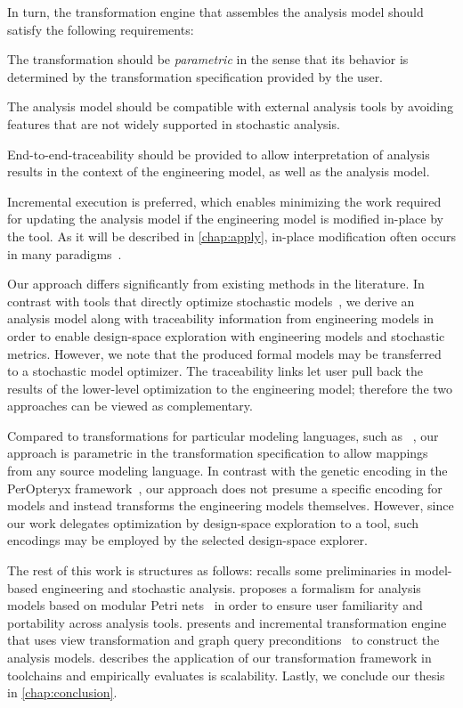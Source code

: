 In turn, the transformation engine that assembles the analysis model should satisfy the following requirements:
\begin{enumerate*}
\item The transformation should be \emph{parametric} in the sense that its behavior is determined by the transformation specification provided by the user.
\item The analysis model should be compatible with external analysis tools by avoiding features that are not widely supported in stochastic analysis.
\item End-to-end-traceability should be provided to allow interpretation of analysis results in the context of the engineering model, as well as the analysis model.
\item Incremental execution is preferred, which enables minimizing the work required for updating the analysis model if the engineering model is modified in-place by the  tool. As it will be described in \cref{chap:apply}, in-place modification often occurs in many  paradigms~\citep{Vanherpen14patterns}.
\end{enumerate*}

Our approach differs significantly from existing methods in the literature. In contrast with tools that directly optimize stochastic models~, we derive an analysis model along with traceability information from engineering models in order to enable design-space exploration with engineering models and stochastic metrics. However, we note that the produced formal models may be transferred to a stochastic model optimizer. The traceability links let user pull back the results of the lower-level optimization to the engineering model; therefore the two approaches can be viewed as complementary.

Compared to transformations for particular modeling languages, such as ~, our approach is parametric in the transformation specification to allow mappings from any source modeling language. In contrast with the genetic encoding in the PerOpteryx framework~\citep{Koziolek11generic}, our approach does not presume a specific encoding for models and instead transforms the engineering models themselves. However, since our work delegates optimization by design-space exploration to a  tool, such encodings may be employed by the selected design-space explorer.

The rest of this work is structures as follows:  recalls some preliminaries in model-based engineering and stochastic analysis.  proposes a formalism for analysis models based on modular Petri nets~\citep{Kindler09modular} in order to ensure user familiarity and portability across analysis tools.  presents and incremental transformation engine that uses view transformation and graph query preconditions~\citep{Debreceni14viewmodel} to construct the analysis models.  describes the application of our transformation framework in  toolchains and empirically evaluates is scalability. Lastly, we conclude our thesis in \cref{chap:conclusion}.

